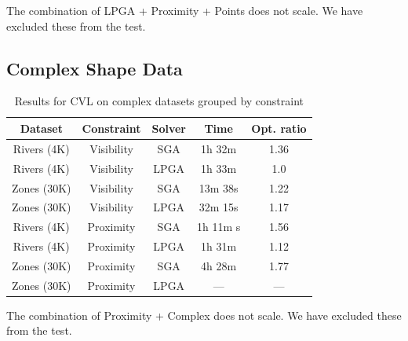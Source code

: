 


The combination of LPGA + Proximity + Points does not scale. We have excluded these from the test.

\subsection{Complex Shape Data}
\label{sec:exp:complex:shapes}

\begin{table}[htdp]
\caption{Results for CVL on complex datasets grouped by constraint}
\begin{center}
\begin{tabular}{|c|c|c|c|c|}
\hline
\textbf{Dataset} & \textbf{Constraint} & \textbf{Solver} & \textbf{Time} & \textbf{Opt. ratio}\\ 
\hline
Rivers (4K) & Visibility & SGA & 1h 32m & 1.36 \\
Rivers (4K) & Visibility & LPGA & 1h 33m & 1.0 \\
Zones (30K) & Visibility & SGA & 13m 38s & 1.22 \\
Zones (30K) & Visibility & LPGA & 32m 15s & 1.17 \\
\hline
Rivers (4K)  & Proximity  & SGA& 1h 11m s & 1.56 \\
Rivers (4K)  & Proximity & LPGA & 1h 31m & 1.12 \\
Zones (30K) & Proximity & SGA & 4h 28m & 1.77 \\
Zones (30K) & Proximity & LPGA & --- & --- \\
\hline
\end{tabular}
\end{center}
\label{tab:results:overview}
\end{table}%




The combination of Proximity + Complex does not scale. We have excluded these from the test.

